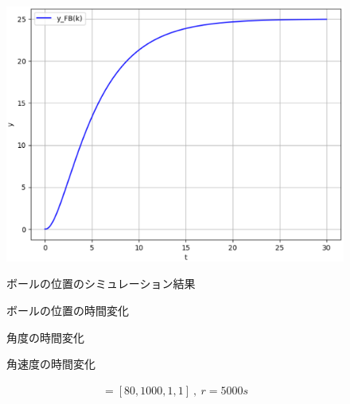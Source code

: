 \documentclass[a4paper,10.5pt]{ltjsarticle}
\begin{document}
\begin{figure}[h]
  \vspace{-30pt}
  \centering
  \begin{minipage}{0.4\linewidth}
    \centering
    \includegraphics[scale=0.35]{figure20.eps}
    \caption{ボールの位置のシミュレーション結果}
    \label{fig:figure32}
  \end{minipage}
  \begin{minipage}[h]{0.4\linewidth}
    \centering
    
    \vspace{-30pt}\caption{ボールの位置の時間変化}
    \label{fig:figure33}
  \end{minipage}
  \begin{minipage}[h]{0.4\linewidth}
    \centering
    
    \vspace{-30pt}\caption{角度の時間変化}
    \label{fig:figure34}
  \end{minipage}
  \begin{minipage}[h]{0.4\linewidth}
    \centering
    
    \vspace{-30pt}\caption{角速度の時間変化}
    \label{fig:figure35}
  \end{minipage}
\end{figure}
\begin{align}
  [q_1,q_2,q_3,q_4]=[80,1000,1,1]\ ,\ r=5000s
\end{align}
\end{document}
